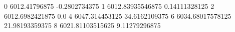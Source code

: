0 6012.41796875 -0.2802734375
1 6012.83935546875 0.14111328125
2 6012.6982421875 0.0
4 6047.314453125 34.6162109375
6 6034.68017578125 21.98193359375
8 6021.81103515625 9.11279296875
